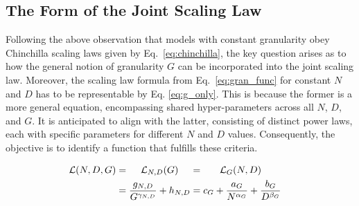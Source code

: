 \subsection{The Form of the Joint Scaling Law}\label{sub:joint}


Following the above observation that models with constant granularity obey Chinchilla scaling laws given by Eq.~\ref{eq:chinchilla}, the key question arises as to how the general notion of granularity $G$ can be incorporated into the joint scaling law. %
Moreover, the scaling law formula from Eq.~\ref{eq:gran_func} for constant $N$ and $D$ has to be representable by Eq. \ref{eq:g_only}. This is because the former is a more general equation, encompassing shared hyper-parameters across all $N$, $D$, and $G$. It is anticipated to align with the latter, consisting of distinct power laws, each with specific parameters for different $N$ and $D$ values. Consequently, the objective is to identify a function that fulfills these criteria.

\begin{align}\label{eq:l_general}
     \mathcal{L}(N, D, G) &= \hspace{0.43cm} \mathcal{L}_{N,D}(G)  \hspace{0.43cm} = \hspace{0.6cm} \mathcal{L}_G(N,D) & \\
      &= \frac{g_{N,D}}{G^{\gamma_{N,D}}} + h_{N,D} = c_G + \frac{a_G}{N^{\alpha_G}} + \frac{b_G}{D^{\beta_G}} & \nonumber
\end{align}

